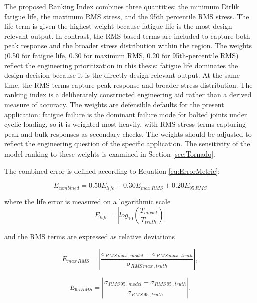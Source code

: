 \documentclass[a4paper,twoside]{bth}
\begin{document}
The proposed Ranking Index combines three quantities: the minimum Dirlik fatigue life, the maximum \ac{RMS} stress, and the 95th percentile \ac{RMS} stress. The life term is given the highest weight because fatigue life is the most design-relevant output. In contrast, the RMS-based terms are included to capture both peak response and the broader stress distribution within the region. 
The weights (0.50 for fatigue life, 0.30 for maximum RMS, 0.20 for 95th-percentile RMS) reflect the engineering prioritization in this thesis: fatigue life dominates the design decision because it is the directly design-relevant output. At the same time, the \ac{RMS} terms capture peak response and broader stress distribution. The ranking index is a deliberately constructed engineering aid rather than a derived measure of accuracy. The weights are defensible defaults for the present application: fatigue failure is the dominant failure mode for bolted joints under cyclic loading, so it is weighted most heavily, with RMS-stress terms capturing peak and bulk responses as secondary checks. The weights should be adjusted to reflect the engineering question of the specific application. The sensitivity of the model ranking to these weights is examined in Section \ref{sec:Tornado}.

The combined error is defined according to Equation \ref{eq:ErrorMetric}:

\begin{equation} \label{eq:ErrorMetric}
    E_{combined} = 0.50E_{life} + 0.30 E_{max\, RMS} + 0.20E_{95\, RMS}
\end{equation}

where the life error is measured on a logarithmic scale
\begin{equation} \label{eq:Elife}
    E_{life} = \left| log_{10}\left( \frac{T_{model}}{T_{truth}} \right) \right|
\end{equation}

and the \ac{RMS} terms are expressed as relative deviations

\begin{equation} \label{eq:EMaxRMS}
     E_{max\, RMS} = \left| \frac{\sigma_{RMS\, max \, , model} - \sigma_{RMS\, max \, , truth}}{\sigma_{RMS\, max \, , truth}} \right|,
\end{equation}

\begin{equation} \label{eq:E95RMS}
    E_{95\, RMS} = \left| \frac{\sigma_{RMS\, 95 \, , model} - \sigma_{RMS\, 95 \, , truth}}{\sigma_{RMS\, 95 \, , truth}} \right|.
\end{equation}
\end{document}
